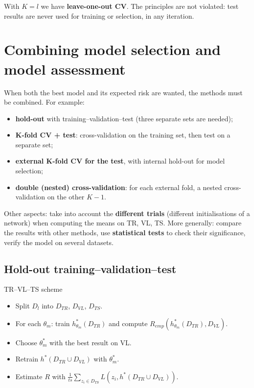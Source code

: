With \(K = l\) we have \textbf{leave-one-out CV}. The principles are
not violated: test results are never used for training or selection,
in any iteration.

\section{Combining model selection and model
assessment}\label{combinare-model-selection-e-model-assessment}

When both the best model and its expected risk are wanted, the methods
must be combined. For example:

\begin{itemize}
\tightlist
\item
  \textbf{hold-out} with training--validation--test (three separate
  sets are needed);
\item
  \textbf{K-fold CV + test}: cross-validation on the training set, then
  test on a separate set;
\item
  \textbf{external K-fold CV for the test}, with internal hold-out for
  model selection;
\item
  \textbf{double (nested) cross-validation}: for each external fold, a
  nested cross-validation on the other \(K-1\).
\end{itemize}

Other aspects: take into account the \textbf{different trials}
(different initialisations of a network) when computing the means on
TR, VL, TS. More generally: compare the results with other methods,
use \textbf{statistical tests} to check their significance, verify the
model on several datasets.

\subsection{Hold-out
training--validation--test}\label{hold-out-trainingvalidationtest}

\begin{boxabstract}{TR--VL--TS scheme}

\begin{itemize}
\tightlist
\item
  Split \(D_l\) into \(D_{TR}\), \(D_{VL}\), \(D_{TS}\).
\item
  For each \(\theta_m\): train \(h^*_{\theta_m}(D_{TR})\) and compute
  \(R_{emp}(h^*_{\theta_m}(D_{TR}), D_{VL})\).
\item
  Choose \(\theta^*_m\) with the best result on VL.
\item
  Retrain \(h^*(D_{TR} \cup D_{VL})\) with \(\theta^*_m\).
\item
  Estimate \(R\) with
  \(\frac{1}{ts}\sum_{z_i \in D_{TS}} L(z_i, h^*(D_{TR} \cup D_{VL}))\).
\end{itemize}

\end{boxabstract}

